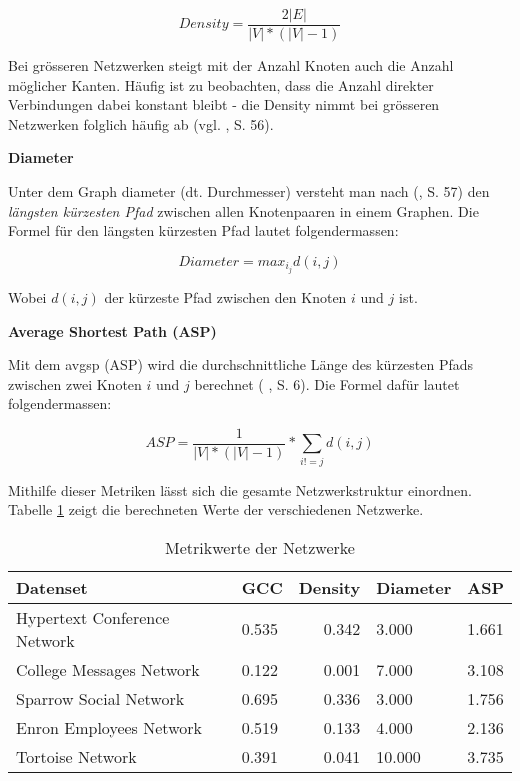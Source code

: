 \begin{equation}
    \label{eq:density}
    Density = \frac{2|E|}{|V|*(|V|-1)}
\end{equation}


Bei grösseren Netzwerken steigt mit der Anzahl Knoten auch die Anzahl möglicher Kanten.
Häufig ist zu beobachten, dass die Anzahl direkter Verbindungen dabei konstant bleibt - die Density nimmt bei grösseren Netzwerken folglich häufig ab (vgl. \citeauthor{michael_henninger_soziale_2018} \citeyear{michael_henninger_soziale_2018}, S. 56).

\textbf{Diameter}

Unter dem Graph \acs{diameter} (dt. Durchmesser) versteht man nach \citeauthor{michael_henninger_soziale_2018} (\citeyear{michael_henninger_soziale_2018}, S. 57) den \textit{längsten kürzesten Pfad} zwischen allen Knotenpaaren in einem Graphen.
Die Formel für den längsten kürzesten Pfad lautet folgendermassen:

\begin{equation}
    \label{eq:diameter}
    Diameter = max_i_jd(i,j)
\end{equation}

Wobei $d(i,j)$ der kürzeste Pfad zwischen den Knoten $i$ und $j$ ist.

\textbf{Average Shortest Path (ASP)}

Mit dem \acs{avgsp} (ASP) wird die durchschnittliche Länge des kür\-zes\-ten Pfads zwischen zwei Knoten $i$ und $j$ berechnet (\citeauthor{gao_link_2015} \citeyear{gao_link_2015}, S. 6).
Die Formel dafür lautet folgendermassen:

\begin{equation}
    \label{eq:asp}
    ASP = \frac{1}{|V| * (|V| - 1)} * \sum\limits_{i!=j} d(i,j)
\end{equation}

Mithilfe dieser Metriken lässt sich die gesamte Netzwerkstruktur einordnen.
Tabelle \ref{tab_metrics} zeigt die berechneten Werte der verschiedenen Netzwerke.

\begin{table}[h]
    \centering
    \begin{tabular}{@{}llrll@{}}
        \toprule
        Datenset                         & GCC      & Density      & Diameter & ASP      \\ \midrule
        Hypertext Conference Network                & 0.535 & 0.342 & 3.000 & 1.661 \\
        College Messages Network         & 0.122 & 0.001 & 7.000 & 3.108 \\
        Sparrow Social Network           & 0.695 & 0.336 & 3.000 & 1.756 \\
        Enron Employees Network          & 0.519 & 0.133 & 4.000 & 2.136 \\
        Tortoise Network                 & 0.391 & 0.041 & 10.000 & 3.735 \\ \bottomrule
    \end{tabular}%
    \caption{Metrikwerte der Netzwerke}
    \label{tab_metrics}
\end{table}

